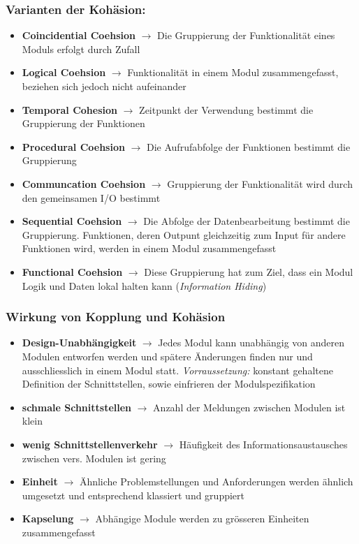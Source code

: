 \documentclass{report}
\theoremstyle{definition}
\theoremstyle{example}
\begin{document}
\subsubsection{Varianten der Kohäsion:}
\begin{itemize}
	\item \textbf{Coincidential Coehsion} $\rightarrow$ Die Gruppierung der Funktionalität eines Moduls erfolgt durch Zufall
	\item \textbf{Logical Coehsion} $\rightarrow$ Funktionalität in einem Modul zusammengefasst, beziehen sich jedoch nicht aufeinander
	\item \textbf{Temporal Cohesion} $\rightarrow$ Zeitpunkt der Verwendung bestimmt die Gruppierung der Funktionen
	\item \textbf{Procedural Coehsion} $\rightarrow$ Die Aufrufabfolge der Funktionen bestimmt die Gruppierung
	\item \textbf{Communcation Coehsion} $\rightarrow$ Gruppierung der Funktionalität wird durch den gemeinsamen I/O bestimmt
	\item \textbf{Sequential Coehsion} $\rightarrow$ Die Abfolge der Datenbearbeitung bestimmt die Gruppierung. Funktionen, deren Outpunt gleichzeitig zum Input für andere Funktionen wird, werden in einem Modul zusammengefasst
	\item \textbf{Functional Coehsion} $\rightarrow$ Diese Gruppierung hat zum Ziel, dass ein Modul Logik und Daten lokal halten kann (\textit{Information Hiding})
\end{itemize}

\subsubsection{Wirkung von Kopplung und Kohäsion}
\begin{itemize}
	\item \textbf{Design-Unabhängigkeit} $\rightarrow$ Jedes Modul kann unabhängig von anderen Modulen entworfen werden und spätere Änderungen finden nur und ausschliesslich in einem Modul statt. \textit{Vorraussetzung:} konstant gehaltene Definition der Schnittstellen, sowie einfrieren der Modulspezifikation
	\item \textbf{schmale Schnittstellen} $\rightarrow$ Anzahl der Meldungen zwischen Modulen ist klein
	\item  \textbf{wenig Schnittstellenverkehr} $\rightarrow$ Häufigkeit des Informationsaustausches zwischen vers. Modulen ist gering
	\item \textbf{Einheit} $\rightarrow$ Ähnliche Problemstellungen und Anforderungen werden ähnlich umgesetzt und entsprechend klassiert und gruppiert
	\item \textbf{Kapselung} $\rightarrow$ Abhängige Module werden zu grösseren Einheiten zusammengefasst
\end{itemize}
\end{document}

